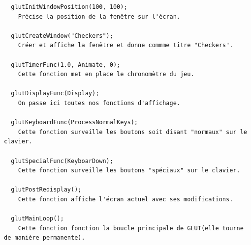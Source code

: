 \documentclass[a4paper]{article}
\begin{document}
\begin{verbatim}
  glutInitWindowPosition(100, 100);
    Précise la position de la fenêtre sur l'écran.

  glutCreateWindow("Checkers");
    Créer et affiche la fenêtre et donne commme titre "Checkers".

  glutTimerFunc(1.0, Animate, 0);
    Cette fonction met en place le chronomètre du jeu.

  glutDisplayFunc(Display);
    On passe ici toutes nos fonctions d'affichage.

  glutKeyboardFunc(ProcessNormalKeys);
    Cette fonction surveille les boutons soit disant "normaux" sur le clavier.

  glutSpecialFunc(KeyboarDown);
    Cette fonction surveille les boutons "spéciaux" sur le clavier.

  glutPostRedisplay();
    Cette fonction affiche l'écran actuel avec ses modifications.

  glutMainLoop();
    Cette fonction fonction la boucle principale de GLUT(elle tourne de manière permanente).

\end{verbatim}
\end{document}
